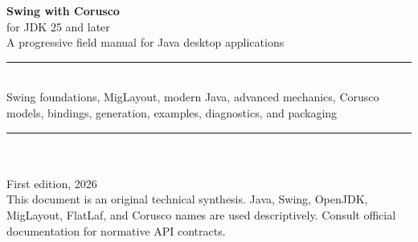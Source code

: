 \begin{titlepage}
\centering
\vspace*{18mm}
{\Huge\bfseries Swing with Corusco\\[2mm]}
{\LARGE for JDK 25 and later\\[12mm]}
{\large A progressive field manual for Java desktop applications\\[30mm]}
\rule{0.72\linewidth}{0.45pt}\\[5mm]
{\large Swing foundations, MigLayout, modern Java, advanced mechanics, Corusco models, bindings, generation, examples, diagnostics, and packaging}\\[5mm]
\rule{0.72\linewidth}{0.45pt}\\[28mm]
{\Large \bookedition}\\[3mm]
{\large First edition, 2026}\\[20mm]
\vfill
{\small This document is an original technical synthesis. Java, Swing, OpenJDK, MigLayout, FlatLaf, and Corusco names are used descriptively. Consult official documentation for normative API contracts.}
\end{titlepage}
